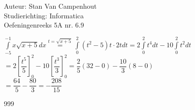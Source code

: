 \documentclass[a4paper]{article}
\begin{document}
  
\noindent \large Auteur: Stan Van Campenhout \\
\noindent \large Studierichting:  Informatica\\
\noindent \large Oefeningenreeks 5A nr. 6.9\\

\medskip

\normalsize

$ \displaystyle\int\limits_{-5}^{-1}x\sqrt{x+5}dx \stackrel{t = \sqrt{x+5}}{=} \displaystyle\int\limits_0^2\left(t^2-5\right)t\cdot2tdt 
= 2\displaystyle\int\limits_0^2t^4dt - 10 \displaystyle\int\limits_0^2t^2dt $\\

$ = 2\left[\dfrac{t^5}{5}\right]_0^2 - 10\left[\dfrac{t^3}{3}\right]_0^2 = \dfrac{2}{5}\left(32-0\right)-\dfrac{10}{3}\left(8-0\right) $\\

$ = \dfrac{64}{5} - \dfrac{80}{3} = -\dfrac{208}{15} $\\

\begin{thebibliography}{999}
\end{thebibliography}
\end{document}
